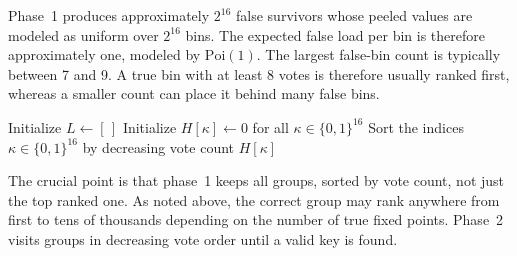 \documentclass[version=preprint]{iacrcc}
\begin{document}
Phase~1 produces approximately $2^{16}$ false survivors whose peeled values are modeled as uniform over $2^{16}$ bins.
The expected false load per bin is therefore approximately one, modeled by $\mathrm{Poi}(1)$.
The largest false-bin count is typically between 7 and 9.
A true bin with at least 8 votes is therefore usually ranked first, whereas a smaller count can place it behind many false bins.

\begin{algorithm}[htbp]
\caption{Phase 1 of the FP attack}\label{alg:fixedpoint-phase1}
\SetAlgoLined
{}
Initialize $L \gets [\,]$\;
Initialize $H[\kappa] \gets 0$ for all $\kappa \in \{0,1\}^{16}$\;
Sort the indices $\kappa \in \{0,1\}^{16}$ by decreasing vote count $H[\kappa]$\;
\;
\end{algorithm}

The crucial point is that phase~1 keeps all groups, sorted by vote count, not just the top ranked one.
As noted above, the correct group may rank anywhere from first to tens of thousands depending on the number of true fixed points.
Phase~2 visits groups in decreasing vote order until a valid key is found.
\end{document}
